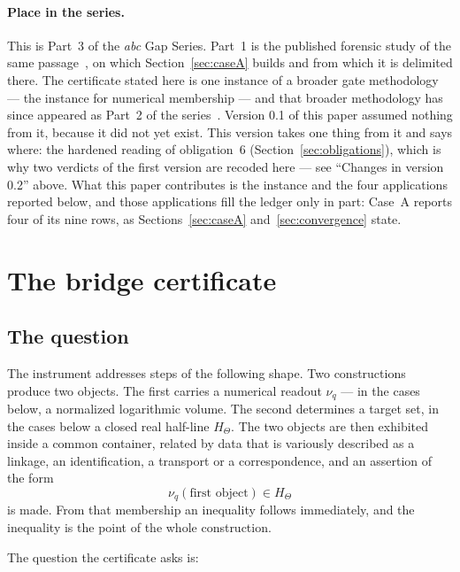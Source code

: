 \documentclass[11pt,a4paper]{article}
\theoremstyle{definition}
\begin{document}
\paragraph{Place in the series.} This is Part~3 of the \emph{abc} Gap Series.
Part~1 is the published forensic study of the same passage~\cite{GeigerGap2026},
on which Section~\ref{sec:caseA} builds and from which it is delimited there. The
certificate stated here is one instance of a broader gate methodology --- the
instance for numerical membership --- and that broader methodology has since
appeared as Part~2 of the series~\cite{GeigerBCM2026}. Version 0.1 of this paper
assumed nothing from it, because it did not yet exist. This version takes one
thing from it and says where: the hardened reading of obligation~6
(Section~\ref{sec:obligations}), which is why two verdicts of the first version
are recoded here --- see ``Changes in version 0.2'' above. What this paper
contributes is the instance and the four applications reported below,
and those applications fill the ledger only in part: Case~A reports four of its
nine rows, as Sections~\ref{sec:caseA} and~\ref{sec:convergence} state.

\section{The bridge certificate}
\label{sec:instrument}

\subsection{The question}

The instrument addresses steps of the following shape. Two constructions produce
two objects. The first carries a numerical readout $\nu_q$ --- in the cases below,
a normalized logarithmic volume. The second determines a target set, in the cases
below a closed real half-line $H_\Theta$. The two objects are then exhibited
inside a common container, related by data that is variously described as a
linkage, an identification, a transport or a correspondence, and an assertion of
the form
\[
  \nu_q(\text{first object}) \in H_\Theta
\]
is made. From that membership an inequality follows immediately, and the
inequality is the point of the whole construction.

The question the certificate asks is:
\end{document}
